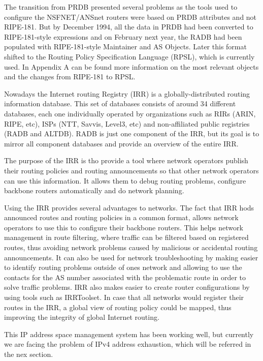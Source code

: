 \documentclass[11pt,a4paper]{scrreprt}
\begin{document}
The transition from PRDB presented several problems as the tools used to configure the NSFNET/ANSnet routers were based on PRDB attributes and not RIPE-181. But by December 1994, all the data in PRDB had been converted to RIPE-181-style expressions and on February next year, the RADB had been populated with RIPE-181-style Maintainer and AS Objects. Later this format shifted to the Routing Policy Specification Language (RPSL), which is currently used. In Appendix A can be found more information on the most relevant objects and the changes from RIPE-181 to RPSL.

Nowadays the Internet routing Registry (IRR) is a globally-distributed routing information database. This set of databases consists of around 34 different databases, each one individually operated by organizations such as RIRs (ARIN, RIPE, etc), ISPs (NTT, Savvis, Level3, etc) and non-affiliated public registries (RADB and ALTDB). RADB is just one component of the IRR, but its goal is to mirror all component databases and provide an overview of the entire IRR. 

The purpose of the IRR is tho provide a tool where network operators publish their routing policies and routing announcements so that other network operators can use this information. It allows them to debug routing problems, configure backbone routers automatically and do network planning. 

Using the IRR provides several advantages to networks. The fact that IRR hods announced routes and routing policies in a common format, allows network operators to use this to configure their backbone routers. This helps network management in route filtering, where traffic can be filtered based on registered routes, thus avoiding network problems caused by malicious or accidental routing announcements. It can also be used for network troubleshooting by making easier to identify routing problems outside of ones network and allowing to use the contacts for the AS number associated with the problematic route in order to solve traffic problems. IRR also makes easier to create router configurations by using tools such as IRRToolset. In case that all networks would register their routes in the IRR, a global view of routing policy could be mapped, thus improving the integrity of global Internet routing. 

This IP address space management system has been working well, but currently we are facing the problem of IPv4 address exhaustion, which will be referred in the nex section.
\end{document}
